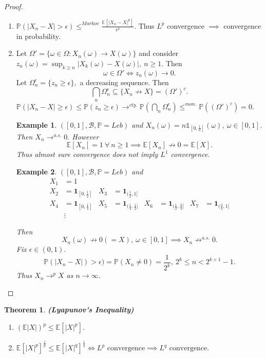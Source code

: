 \documentclass{article}
\newcommand{\1}{\mathds{1}}
\newcommand{\E}{\mathbb{E}}
\newcommand{\B}{\mathcal{B}}
\newcommand{\PB}{\mathbb{P}}
\newcommand{\lf}{\left}
\newcommand{\rg}{\right}
\newcommand{\f}[2]{\frac{#1}{#2}}
\newcommand{\tb}[1]{\lf[#1\rg]}
\newcommand{\card}[1]{\lf\vert #1\rg\vert}
\newtheorem{theorem}{Theorem}[section]
\newtheorem{example}{Example}
\begin{document}
\begin{proof}
    \begin{enumerate}
        \item $\PB(\card{X_n-X}>\epsilon)\leq^{Markov} \f{\E[\card{X_n-X}^p]}{\epsilon^p}.$ Thus $L^p$ convergence $\implies$ convergence in probability.
        \item Let $\Omega'=\{\omega\in\Omega:X_n(\omega)\to X(\omega)\}$ and consider $z_n(\omega)=\sup_{k\geq n}\card{X_k(\omega)-X(\omega)},\ n\geq 1.$ Then $$\omega\in\Omega'\iff z_n(\omega)\to 0.$$ Let $\Omega_n^\epsilon=\{z_n\geq\epsilon\},$ a decreasing sequence. Then $$\bigcap_n\Omega_n^\epsilon\subseteq\{X_n\not\to X\}=(\Omega')^c.$$
        $\PB(\card{X_n-X}\geq\epsilon)\leq \PB(z_n\geq\epsilon)\to^{cty.}\PB(\bigcap_n\Omega_n^\epsilon)\leq^{mon.}\PB((\Omega')^c)=0.$
        \begin{example}
            $([0,1],\B,\PB=Leb)$ and $X_n(\omega)=n\1_{\tb{0,\f 1n}}(\omega),\ \omega\in [0,1].$ Then $X_n\to^{a.s.} 0.$ However $$\E[X_n]=1\ \forall\ n\geq 1\implies \E[X_n]\not\to 0=\E[X].$$ Thus almost sure convergence does not imply $L^1$ convergence.
        \end{example}
        \begin{example}
        $([0,1],\B,\PB=Leb)$ and \[
\begin{array}{cccccccc}
X_1 &= 1 \\
X_2 &= \mathbf{1}_{[0,\tfrac{1}{2}]} & 
X_3 &= \mathbf{1}_{(\tfrac{1}{2},1]} \\
X_4 &= \mathbf{1}_{[0,\tfrac{1}{4}]} & 
X_5 &= \mathbf{1}_{(\tfrac{1}{4},\tfrac{1}{2}]} &
X_6 &= \mathbf{1}_{(\tfrac{1}{2},\tfrac{3}{4}]} &
X_7 &= \mathbf{1}_{(\tfrac{3}{4},1]} \\
& \vdots
\end{array}
\]

        Then $$X_n(\omega)\not\to 0(=X),\ \omega\in [0,1]\implies X_n\not\to^{a.s.} 0.$$ Fix $\epsilon\in (0,1).$
        $$\PB(\card{X_n-X})>\epsilon)=\PB(X_n\ne 0)=\f1 {2^k},\ 2^k\leq n<2^{k+1}-1.$$ Thus $X_n\to^p X$ as $n\to\infty.$
        \end{example}
    \end{enumerate}
\end{proof}
\begin{theorem}\textbf{(Lyapunov's Inequality)}
    \begin{enumerate}
        \item $(\E\card{X})^p\leq \E[\card X^p].$
        \item $\E[\card{X}^p]^{\f 1p}\leq \E[\card{X}^q]^{\f 1q}\iff L^p\text{ convergence}\implies L^q\text{ convergence}.$
    \end{enumerate}
\end{theorem}
\end{document}
